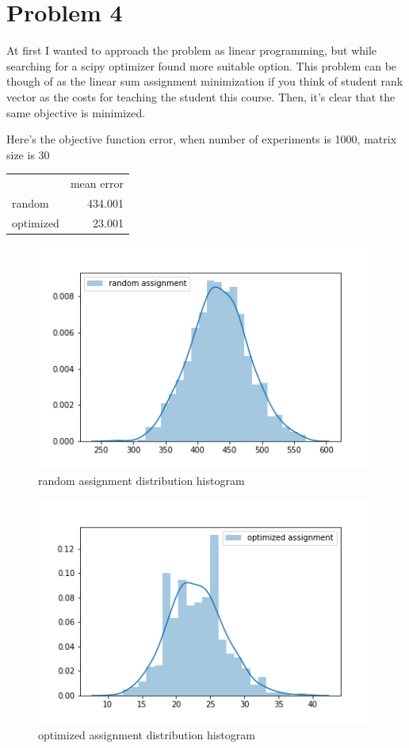 \documentclass{article}
\begin{document}
\section{Problem 4}
At first I wanted to approach the problem as linear programming, but while searching for a scipy optimizer found more suitable option. This problem can be though of as the linear sum assignment minimization if you think of student rank vector as the costs for teaching the student this course. Then, it's clear that the same objective is minimized. 

Here's the objective function error, when number of experiments is 1000, matrix size is 30

\vspace{0.1in}

\begin{tabular}{| l | r |}
    \hline
   & mean error \\
  random & 434.001\\
  optimized & 23.001 \\
  \hline
\end{tabular}

\vspace{0.1in}

\begin{figure}[H]
    \centering
    \includegraphics[scale=0.5]{random.png}
    \caption{random assignment distribution histogram}
    \label{fig:random}
\end{figure}

\begin{figure}[H]
    \centering
    \includegraphics[scale=0.5]{optimized.png}
    \caption{optimized assignment distribution histogram}
    \label{fig:optimize}
\end{figure}
\end{document}
